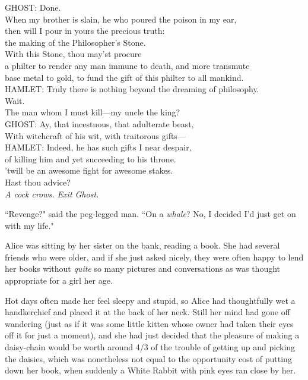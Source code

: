 \begin{playdialog}
GHOST: Done.\\
When my brother is slain, he who poured the poison in my ear,\\
then will I pour in yours the precious truth:\\
the making of the Philosopher's Stone.\\
With this Stone, thou may'st procure\\
a philter to render any man immune to death, and more transmute\\
base metal to gold, to fund the gift of this philter to all mankind.\\

HAMLET: Truly there is nothing beyond the dreaming of philosophy.\\
Wait.\\
The man whom I must kill—my uncle the king?\\

GHOST: Ay, that incestuous, that adulterate beast,\\
With witchcraft of his wit, with traitorous gifts—\\

HAMLET: Indeed, he has such gifts I near despair,\\
of killing him and yet succeeding to his throne.\\
'twill be an awesome fight for awesome stakes.\\
Hast thou advice?\\

\emph{A cock crows. Exit Ghost.}
\end{playdialog}


``Revenge?" said the peg-legged man. ``On a \emph{whale}? No, I decided I'd just get on with my life."


Alice was sitting by her sister on the bank, reading a book. She had several friends who were older, and if she just asked nicely, they were often happy to lend her books without \emph{quite} so many pictures and conversations as was thought appropriate for a girl her age.

Hot days often made her feel sleepy and stupid, so Alice had thoughtfully wet a handkerchief and placed it at the back of her neck. Still her mind had gone off wandering (just as if it was some little kitten whose owner had taken their eyes off it for just a moment), and she had just decided that the pleasure of making a daisy-chain would be worth around 4/3 of the trouble of getting up and picking the daisies, which was nonetheless not equal to the opportunity cost of putting down her book, when suddenly a White Rabbit with pink eyes ran close by her.

